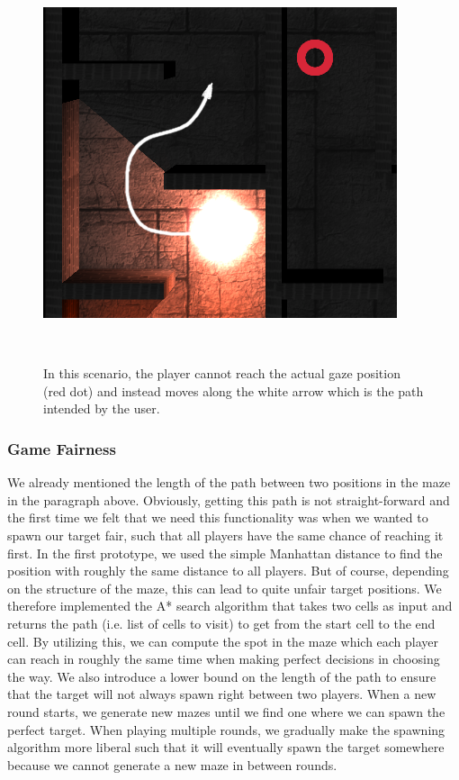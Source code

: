 \documentclass{sigchi}
\begin{document}
\begin{figure}
\centering
  \includegraphics[width=0.9\columnwidth]{figures/algo}
  \caption{In this scenario, the player cannot reach the actual gaze position (red dot) and instead moves along the white arrow which is the path intended by the user. }~\label{fig:figure2}
\end{figure}
\subsubsection{Game Fairness}
We already mentioned the length of the path between two positions in the maze in the paragraph above. Obviously, getting this path is not straight-forward and the first time we felt that we need this functionality was when we wanted to spawn our target fair, such that all players have the same chance of reaching it first. In the first prototype, we used the simple Manhattan distance to find the position with roughly the same distance to all players. But of course, depending on the structure of the maze, this can lead to quite unfair target positions. We therefore implemented the A* search algorithm that takes two cells as input and returns the path (i.e. list of cells to visit) to get from the start cell to the end cell. By utilizing this, we can compute the spot in the maze which each player can reach in roughly the same time when making perfect decisions in choosing the way. We also introduce a lower bound on the length of the path to ensure that the target will not always spawn right between two players. When a new round starts, we generate new mazes until we find one where we can spawn the perfect target. When playing multiple rounds, we gradually make the spawning algorithm more liberal such that it will eventually spawn the target somewhere because we cannot generate a new maze in between rounds.
\end{document}
